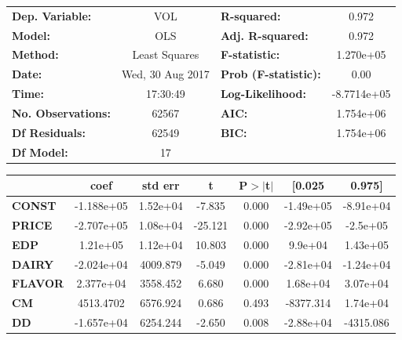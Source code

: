 \documentclass{article}
\begin{document}
\begin{center}
\begin{tabular}{lclc}
\toprule
\textbf{Dep. Variable:}    &        VOL         & \textbf{  R-squared:         } &      0.972    \\
\textbf{Model:}            &       OLS        & \textbf{  Adj. R-squared:    } &      0.972    \\
\textbf{Method:}           &  Least Squares   & \textbf{  F-statistic:       } &  1.270e+05    \\
\textbf{Date:}             & Wed, 30 Aug 2017 & \textbf{  Prob (F-statistic):} &      0.00     \\
\textbf{Time:}             &     17:30:49     & \textbf{  Log-Likelihood:    } & -8.7714e+05   \\
\textbf{No. Observations:} &       62567      & \textbf{  AIC:               } &  1.754e+06    \\
\textbf{Df Residuals:}     &       62549      & \textbf{  BIC:               } &  1.754e+06    \\
\textbf{Df Model:}         &          17      & \textbf{                     } &               \\
\bottomrule
\end{tabular}
\begin{tabular}{lcccccc}
               & \textbf{coef} & \textbf{std err} & \textbf{t} & \textbf{P$>$$|$t$|$} & \textbf{[0.025} & \textbf{0.975]}  \\
\midrule
\textbf{CONST} &   -1.188e+05  &     1.52e+04     &    -7.835  &         0.000        &    -1.49e+05    &    -8.91e+04     \\
\textbf{PRICE}    &   -2.707e+05  &     1.08e+04     &   -25.121  &         0.000        &    -2.92e+05    &     -2.5e+05     \\
\textbf{EDP}    &     1.21e+05  &     1.12e+04     &    10.803  &         0.000        &      9.9e+04    &     1.43e+05     \\
\textbf{DAIRY}    &   -2.024e+04  &     4009.879     &    -5.049  &         0.000        &    -2.81e+04    &    -1.24e+04     \\
\textbf{FLAVOR}    &    2.377e+04  &     3558.452     &     6.680  &         0.000        &     1.68e+04    &     3.07e+04     \\
\textbf{CM}    &    4513.4702  &     6576.924     &     0.686  &         0.493        &    -8377.314    &     1.74e+04     \\
\textbf{DD}    &   -1.657e+04  &     6254.244     &    -2.650  &         0.008        &    -2.88e+04    &    -4315.086     \\

\end{tabular}
\end{center}
\end{document}
